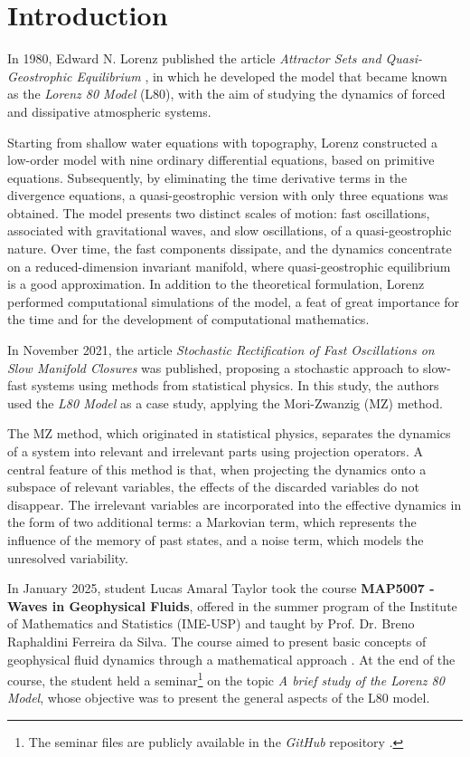 \documentclass[12pt]{article}
\begin{document}
\newpage

\section*{Introduction}

In 1980, Edward N. Lorenz published the article \textit{Attractor Sets and Quasi-Geostrophic Equilibrium} \citep{Lorenz1980}, in which he developed the model that became known as the \textit{Lorenz 80 Model} (L80), with the aim of studying the dynamics of forced and dissipative atmospheric systems.

Starting from shallow water equations with topography, Lorenz constructed a low-order model with nine ordinary differential equations, based on primitive equations. Subsequently, by eliminating the time derivative terms in the divergence equations, a quasi-geostrophic version with only three equations was obtained. The model presents two distinct scales of motion: fast oscillations, associated with gravitational waves, and slow oscillations, of a quasi-geostrophic nature. Over time, the fast components dissipate, and the dynamics concentrate on a reduced-dimension invariant manifold, where quasi-geostrophic equilibrium is a good approximation. In addition to the theoretical formulation, Lorenz performed computational simulations of the model, a feat of great importance for the time and for the development of computational mathematics.

In November 2021, the article \textit{Stochastic Rectification of Fast Oscillations on Slow Manifold Closures} \citep{Chekroun2021} was published, proposing a stochastic approach to slow-fast systems using methods from statistical physics. In this study, the authors used the \textit{L80 Model} as a case study, applying the Mori-Zwanzig (MZ) method.

The MZ method, which originated in statistical physics, separates the dynamics of a system into relevant and irrelevant parts using projection operators. A central feature of this method is that, when projecting the dynamics onto a subspace of relevant variables, the effects of the discarded variables do not disappear. The irrelevant variables are incorporated into the effective dynamics in the form of two additional terms: a Markovian term, which represents the influence of the memory of past states, and a noise term, which models the unresolved variability.

In January 2025, student Lucas Amaral Taylor took the course \textbf{MAP5007 - Waves in Geophysical Fluids}, offered in the summer program of the Institute of Mathematics and Statistics (IME-USP) and taught by Prof. Dr. Breno Raphaldini Ferreira da Silva. The course aimed to present basic concepts of geophysical fluid dynamics through a mathematical approach \citep{uspJanus}. At the end of the course, the student held a seminar\footnote{The seminar files are publicly available in the \textit{GitHub} repository \citep{TaylorL80}.} on the topic \textit{A brief study of the Lorenz 80 Model}, whose objective was to present the general aspects of the L80 model.
\end{document}
